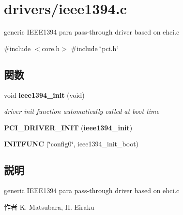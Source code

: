 \section{drivers/ieee1394.c}
\label{ieee1394_8c}


generic \-I\-E\-E\-E1394 para pass-\/through driver based on ehci.\-c  


{\ttfamily \#include $<$core.\-h$>$}\*
{\ttfamily \#include \char`\"{}pci.\-h\char`\"{}}\*
\subsection*{関数}
\begin{DoxyCompactItemize}
\item 
void {\bf ieee1394\-\_\-init} (void)\label{ieee1394_8c_affa77df568604658406553aa2b46aef2}

\begin{DoxyCompactList}\small\item\em driver init function automatically called at boot time \end{DoxyCompactList}\item 
{\bfseries \-P\-C\-I\-\_\-\-D\-R\-I\-V\-E\-R\-\_\-\-I\-N\-I\-T} ({\bf ieee1394\-\_\-init})\label{ieee1394_8c_a3de491c24d608d30d7b808f485461fcb}

\item 
{\bfseries \-I\-N\-I\-T\-F\-U\-N\-C} (\char`\"{}config0\char`\"{}, ieee1394\-\_\-init\-\_\-boot)\label{ieee1394_8c_a5bfa7511f1154c45d4052d703ea5c1dc}

\end{DoxyCompactItemize}


\subsection{説明}
generic \-I\-E\-E\-E1394 para pass-\/through driver based on ehci.\-c \begin{DoxyAuthor}{作者}
\-K. \-Matsubara, \-H. \-Eiraku 
\end{DoxyAuthor}
